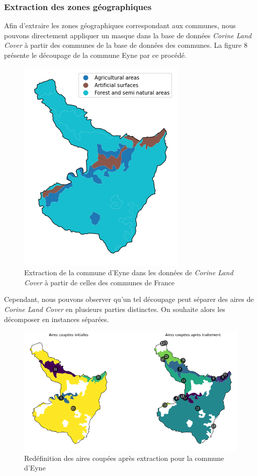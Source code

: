 \subsubsection{Extraction des zones géographiques}

Afin d'extraire les zones géographiques correspondant aux communes, nous pouvons directement appliquer un masque dans la base de données \emph{Corine Land Cover} à partir des communes de la base de données des communes.
La figure 8 présente le découpage de la commune Eyne par ce procédé.

\begin{figure}
    \centering
    \includegraphics[scale=0.5]{figures/eyne-decoupe-brute}
    \caption{Extraction de la commune d'Eyne dans les données de \emph{Corine Land Cover} à partir de celles des communes de France}
\end{figure}

Cependant, nous pouvons observer qu'un tel découpage peut séparer des aires de \emph{Corine Land Cover} en plusieurs parties distinctes. On souhaite alors les décomposer en instances séparées.

\begin{figure}
    \centering
    \includegraphics[scale=0.5]{figures/eyne-redef-aires}
    \caption{Redéfinition des aires coupées après extraction pour la commune d'Eyne}
\end{figure}



